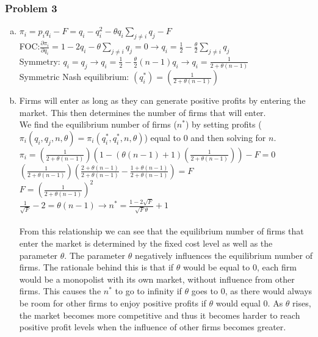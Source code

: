 \documentclass[a4paper]{article}
\begin{document}
\subsubsection{Problem 3}\label{problem3}
\begin{enumerate}[(a)]
\item
$\pi_i=p_iq_i-F=q_i-q_i^2-\theta q_i \sum\limits_{j\ne i} q_j-F$\\
FOC:$ \frac{\partial\pi_i}{\partial q_i}=1-2q_i-\theta\sum\limits_{j\ne i}q_j=0 \rightarrow q_i=\frac{1}{2}-\frac{\theta}{2}\sum\limits_{j \ne i}q_j$\\
Symmetry: $q_i=q_j \rightarrow q_i=\frac{1}{2}-\frac{\theta}{2}(n-1)q_i \rightarrow q_i=\frac{1}{2+\theta(n-1)}$
\\Symmetric Nash equilibrium: $(q_i^*)=(\frac{1}{2+\theta(n-1)})$
\item
Firms will enter as long as they can generate positive profits by entering the market. This then determines the number of firms that will enter.\\
We find the equilibrium number of firms ($n^*$) by setting profits ($\pi_i(q_i,q_j,n,\theta)=\pi_i(q_i^*,q_i^*,n,\theta)$) equal to $0$ and then solving for $n$.\\
$\pi_i=\left(\frac{1}{2+\theta(n-1)}\right)\left(1-(\theta(n-1)+1)\left(\frac{1}{2+\theta(n-1)}\right)\right)-F=0$\\
$\left(\frac{1}{2+\theta(n-1)}\right)\left(\frac{2+\theta(n-1)}{2+\theta(n-1)}-\frac{1+\theta(n-1)}{2+\theta(n-1)}\right)=F$\\$F=\left(\frac{1}{2+\theta(n-1)}\right)^2$\\
$\frac{1}{\sqrt{F}}-2=\theta(n-1)\rightarrow n^*=\frac{1-2\sqrt{F}}{\sqrt{F}\theta}+1$\\ 
\\
From this relationship we can see that the equilibrium number of firms that enter the market is determined by the fixed cost level as well as the parameter $\theta$. The parameter $\theta$ negatively influences the equilibrium number of firms. The rationale behind this is that if $\theta$ would be equal to 0, each firm would be a monopolist with its own market, without influence from other firms. This causes the $n^*$ to go to infinity if $\theta$ goes to 0, as there would always be room for other firms to enjoy positive profits if $\theta$ would equal 0. As $\theta$ rises, the market becomes more competitive and thus it becomes harder to reach positive profit levels when the influence of other firms becomes greater.  




\end{enumerate}
\end{document}

